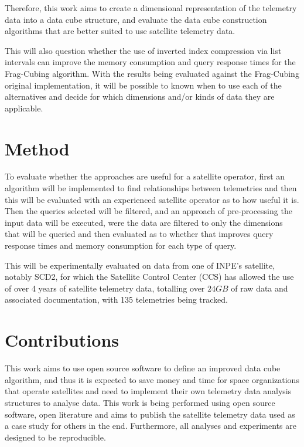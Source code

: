 Therefore, this work aims to create a dimensional representation of the telemetry data into a data cube structure, and evaluate the data cube construction algorithms that are better suited to use satellite telemetry data.

This will also question whether the use of inverted index compression via list intervals can improve the memory consumption and query response times for the Frag-Cubing algorithm.
With the results being evaluated against the Frag-Cubing original implementation, it will be possible to known when to use each of the alternatives and decide for which dimensions and/or kinds of data they are applicable.

\section{Method}\label{ch:intro:method}

To evaluate whether the approaches are useful for a satellite operator, first an algorithm will be implemented to find relationships between telemetries and then this will be evaluated with an experienced satellite operator as to how useful it is.
Then the queries selected will be filtered, and an approach of pre-processing the input data will be executed, were the data are filtered to only the dimensions that will be queried and then evaluated as to whether that improves query response times and memory consumption for each type of query.

This will be experimentally evaluated on data from one of INPE's satellite, notably SCD2, for which the Satellite Control Center (CCS) has allowed the use of over 4 years of satellite telemetry data, totalling over $24GB$ of raw data and associated documentation, with 135 telemetries being tracked.


\section{Contributions}\label{ch:intro:contrib}

This work aims to use open source software to define an improved data cube algorithm, and thus it is expected to save money and time for space organizations that operate satellites and need to implement their own telemetry data analysis structures to analyse data.
This work is being performed using open source software, open literature and aims to publish the satellite telemetry data used as a case study for others in the end.
Furthermore, all analyses and experiments are designed to be reproducible.


